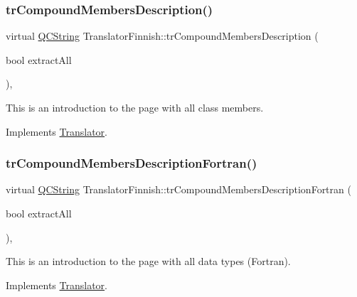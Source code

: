 \subsubsection{\texorpdfstring{trCompoundMembersDescription()}{trCompoundMembersDescription()}}
{\footnotesize\ttfamily virtual \mbox{\hyperlink{class_q_c_string}{Q\+C\+String}} Translator\+Finnish\+::tr\+Compound\+Members\+Description (\begin{DoxyParamCaption}\item[{bool}]{extract\+All }\end{DoxyParamCaption})\hspace{0.3cm}{\ttfamily [inline]}, {\ttfamily [virtual]}}

This is an introduction to the page with all class members. 

Implements \mbox{\hyperlink{class_translator}{Translator}}.

\mbox{\label{class_translator_finnish_a71c6e8bbecb30c45ba69998c99c20942}} 
\subsubsection{\texorpdfstring{trCompoundMembersDescriptionFortran()}{trCompoundMembersDescriptionFortran()}}
{\footnotesize\ttfamily virtual \mbox{\hyperlink{class_q_c_string}{Q\+C\+String}} Translator\+Finnish\+::tr\+Compound\+Members\+Description\+Fortran (\begin{DoxyParamCaption}\item[{bool}]{extract\+All }\end{DoxyParamCaption})\hspace{0.3cm}{\ttfamily [inline]}, {\ttfamily [virtual]}}

This is an introduction to the page with all data types (Fortran). 

Implements \mbox{\hyperlink{class_translator}{Translator}}.

\mbox{\label{class_translator_finnish_a91883d9580dc1762c293cd18e3b49d12}} 
